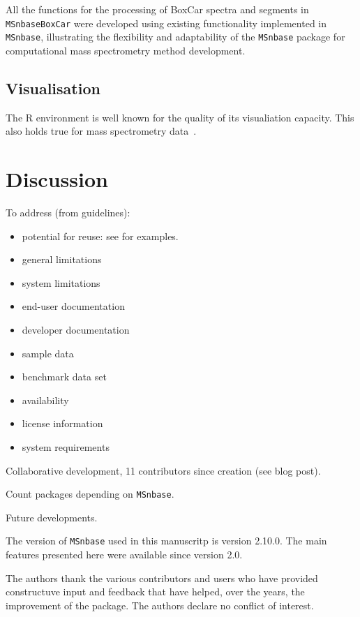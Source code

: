 \documentclass[journal=jacsat,manuscript=article]{achemso}\usepackage[]{graphicx}\usepackage[]{color}
\begin{document}
All the functions for the processing of BoxCar spectra and segments in
\texttt{MSnbaseBoxCar} were developed using existing functionality
implemented in \texttt{MSnbase}, illustrating the flexibility and
adaptability of the \texttt{MSnbase} package for computational mass
spectrometry method development.

\subsection{Visualisation}

The R environment is well known for the quality of its visualiation
capacity. This also holds true for mass spectrometry
data~\cite{Gatto:2015,protViz}.


\section{Discussion}

To address (from guidelines):

\begin{itemize}

\item{potential for reuse}: see
  \cite{Wieczorek:2017,Griss:2019,Smith:2006} for examples.
\item{general limitations}
\item{system limitations}
\item{end-user documentation}
\item{developer documentation}
\item{sample data}
\item{benchmark data set}
\item{availability}
\item{license information}
\item{system requirements}

\end{itemize}

Collaborative development, 11 contributors since creation (see blog
post).

Count packages depending on \texttt{MSnbase}.

Future developments.

The version of \texttt{MSnbase} used in this manuscritp is version
2.10.0. The main features presented here
were available since version 2.0. 



\begin{acknowledgement}

The authors thank the various contributors and users who have provided
constructuve input and feedback that have helped, over the years, the
improvement of the package. The authors declare no conflict of
interest.

\end{acknowledgement}
\end{document}

